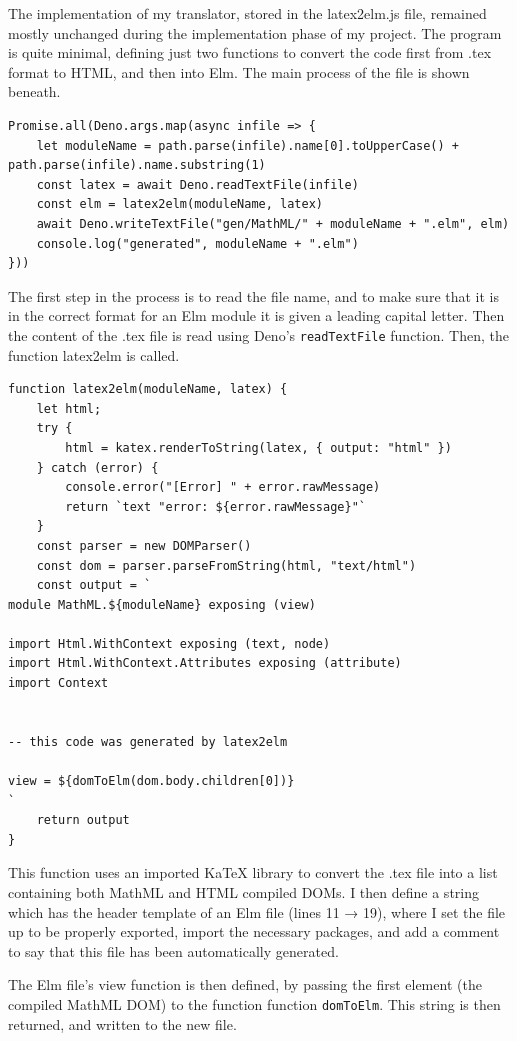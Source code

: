\documentclass{l4proj}
\begin{document}
The implementation of my translator, stored in the latex2elm.js file, remained mostly unchanged during the implementation phase of my project.  The program is quite minimal, defining just two functions to convert the code first from .tex format to HTML, and then into Elm.  The main process of the file is shown beneath.

\begin{lstlisting}
Promise.all(Deno.args.map(async infile => {
    let moduleName = path.parse(infile).name[0].toUpperCase() +                     path.parse(infile).name.substring(1)
    const latex = await Deno.readTextFile(infile)
    const elm = latex2elm(moduleName, latex)
    await Deno.writeTextFile("gen/MathML/" + moduleName + ".elm", elm)
    console.log("generated", moduleName + ".elm")
}))
\end{lstlisting}

The first step in the process is to read the file name, and to make sure that it is in the correct format for an Elm module it is given a leading capital letter.  Then the content of the .tex file is read using Deno's \texttt{readTextFile} function.  Then, the function latex2elm is called.

\begin{lstlisting}
function latex2elm(moduleName, latex) {
    let html;
    try {
        html = katex.renderToString(latex, { output: "html" })
    } catch (error) {
        console.error("[Error] " + error.rawMessage)
        return `text "error: ${error.rawMessage}"`
    }
    const parser = new DOMParser()
    const dom = parser.parseFromString(html, "text/html")
    const output = `
module MathML.${moduleName} exposing (view)

import Html.WithContext exposing (text, node)
import Html.WithContext.Attributes exposing (attribute)
import Context


-- this code was generated by latex2elm

view = ${domToElm(dom.body.children[0])}
`
    return output
}
\end{lstlisting}

This function uses an imported KaTeX library to convert the .tex file into a list containing both MathML and HTML compiled DOMs.  I then define a string which has the header template of an Elm file (lines 11 → 19), where I set the file up to be properly exported, import the necessary packages, and add a comment to say that this file has been automatically generated.

The Elm file's view function is then defined, by passing the first element (the compiled MathML DOM) to the function function \texttt{domToElm}.  This string is then returned, and written to the new file.
\end{document}
